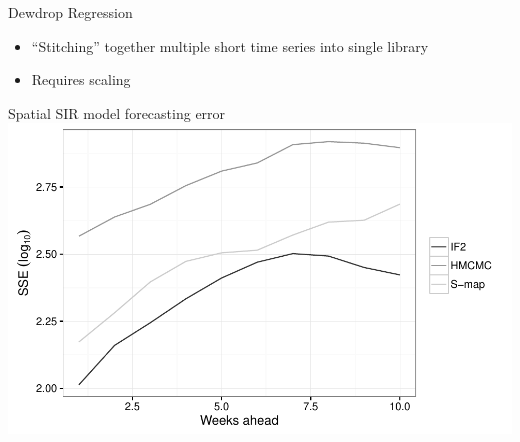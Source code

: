 \documentclass[12pt]{beamer}
\begin{document}
\begin{frame}

	Dewdrop Regression
	\vspace{\baselineskip}

	\begin{itemize}
		\item ``Stitching'' together multiple short time series into single library
		\item Requires scaling
	\end{itemize}

\end{frame}

\begin{frame}

	\null
	\large
	Spatial SIR model forecasting error \\
	\vspace{\baselineskip}
	\includegraphics[width=\textwidth,height=\textheight,keepaspectratio=true]{../../writing/SPATIAL/images/sseplot}

\end{frame}
\end{document}
